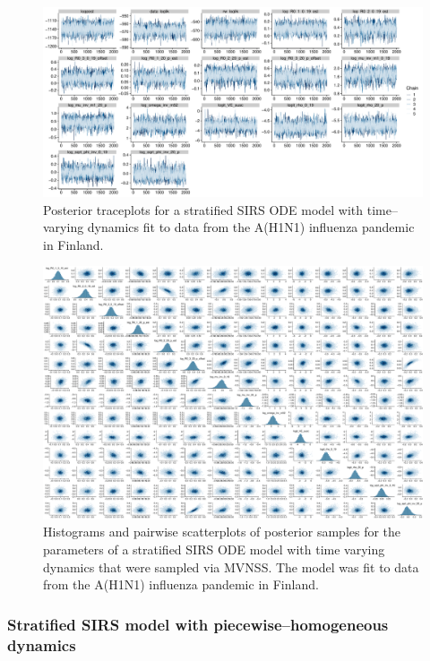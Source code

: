 \begin{figure}
	\centering
	\includegraphics[width=\linewidth]{figures/flu_traces_rw_ode}
	\caption{Posterior traceplots for a stratified SIRS ODE model with time--varying dynamics fit to data from the A(H1N1) influenza pandemic in Finland.}
	\label{fig:flutracesrwode}
\end{figure}

\begin{figure}
	\centering
	\includegraphics[width=\linewidth]{figures/flu_rw_pairs}
	\caption{Histograms and pairwise scatterplots of posterior samples for the parameters of a stratified SIRS ODE model with time varying dynamics that were sampled via MVNSS. The model was fit to data from the A(H1N1) influenza pandemic in Finland.}
	\label{fig:flurwpairs}
\end{figure}

\newpage

\subsubsection{Stratified SIRS model with piecewise--homogeneous dynamics}
\label{subsubsec:flu_additional_res_const}

